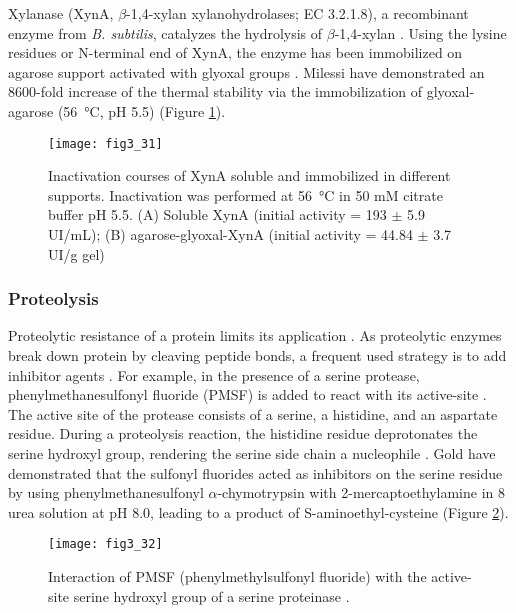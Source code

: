 \begin{refsection}
Xylanase (XynA, $\beta$-1,4-xylan xylanohydrolases; EC 3.2.1.8), a recombinant
enzyme from \emph{B. subtilis}, catalyzes the hydrolysis of $\beta$-1,4-xylan
\cite{Milessi2015,Manrich2010}. Using the lysine residues or N-terminal end of
XynA, the enzyme has been immobilized on agarose support activated with glyoxal
groups \cite{Blanco1991}. Milessi  have demonstrated an 8600-fold
increase of the thermal stability via the immobilization of glyoxal-agarose
(\SI{56}{\celsius}, pH 5.5) \cite{Milessi2015} (Figure \ref{fig:xyna}).
\begin{figure}[htbp] \centering \texttt{[image: fig3\_31]}
    \caption[Inactivation courses of XynA soluble and immobilized in different
        supports. Inactivation was performed at \SI{56}{\celsius} in 50 mM citrate buffer pH
        5.5. (A) Soluble XynA (initial activity = 193 $\pm$ 5.9 UI/mL); (B)
        agarose-glyoxal-XynA (initial activity = 44.84 $\pm$ 3.7 UI/g
    gel)]{Inactivation courses of XynA soluble and immobilized in different
        supports. Inactivation was performed at \SI{56}{\celsius} in 50 mM citrate buffer pH
        5.5. (A) Soluble XynA (initial activity = 193 $\pm$ 5.9 UI/mL); (B)
    agarose-glyoxal-XynA (initial activity = 44.84 $\pm$ 3.7 UI/g gel)}
    \label{fig:xyna}
\end{figure}

\subsubsection{Proteolysis}

Proteolytic resistance of a protein limits its application
\cite{Ottesen1967,Daniel1982,Fontana2004}. As proteolytic enzymes break down
protein by cleaving peptide bonds, a frequent used strategy is to add inhibitor
agents \cite{Ryan2013,Rawlings2012}. For example, in the presence of a serine
protease, phenylmethanesulfonyl fluoride (PMSF) is added to react with its
active-site \cite{Ryan2013,James1978,Gold1965}. The active site of the protease
consists of a serine, a histidine, and an aspartate residue. During a
proteolysis reaction, the histidine residue deprotonates the serine hydroxyl
group, rendering the serine side chain a nucleophile \cite{James1978,Gold1965}.
Gold  have demonstrated that the sulfonyl fluorides acted as
inhibitors on the serine residue by using phenylmethanesulfonyl
$\alpha$-chymotrypsin with 2-mercaptoethylamine in \SI{8}{\Molar} urea solution
at pH 8.0, leading to a product of S-aminoethyl-cysteine \cite{Gold1965}
(Figure \ref{fig:pmsf}). 
\begin{figure}[htbp] \centering \texttt{[image: fig3\_32]}
    \caption[Interaction of PMSF (phenylmethylsulfonyl fluoride) with the
    active-site serine hydroxyl group of a serine proteinase.]{Interaction of
        PMSF (phenylmethylsulfonyl fluoride) with the active-site serine
        hydroxyl group of a serine proteinase \cite{James1978,Gold1965}.}
    \label{fig:pmsf}
\end{figure}


\end{refsection}
